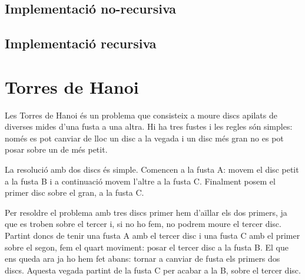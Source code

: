 \subsection{Implementació no-recursiva}


\subsection{Implementació recursiva}


\section{Torres de Hanoi}
Les Torres de Hanoi és un problema que consisteix a moure discs apilats de diverses mides d'una fusta a una altra.
Hi ha tres fustes i les regles són simples: només es pot canviar de lloc un disc a la vegada i un disc més gran no es pot posar sobre un de més petit.

La resolució amb dos discs és simple. Comencen a la fusta A: movem el disc petit a la fusta B i a continuació movem l'altre a la fusta C. Finalment posem el primer disc sobre el gran, a la fusta C.

\noindent
\begin{center}
	\resizebox{0.49\textwidth}{!}{}
	\resizebox{0.49\textwidth}{!}{}
	\resizebox{0.49\textwidth}{!}{}
	\resizebox{0.49\textwidth}{!}{}
\end{center}

Per resoldre el problema amb tres discs primer hem d'aïllar els dos primers, ja que es troben sobre el tercer i, si no ho fem, no podrem moure el tercer disc.
Partint doncs de tenir una fusta A amb el tercer disc i una fusta C amb el primer sobre el segon, fem el quart moviment: posar el tercer disc a la fusta B.
El que ens queda ara ja ho hem fet abans: tornar a canviar de fusta els primers dos discs.
Aquesta vegada partint de la fusta C per acabar a la B, sobre el tercer disc.

\noindent
\begin{center}
	\resizebox{0.32\textwidth}{!}{}
	\resizebox{0.32\textwidth}{!}{}
	\resizebox{0.32\textwidth}{!}{}
	\resizebox{0.32\textwidth}{!}{}
	\resizebox{0.32\textwidth}{!}{}
	\resizebox{0.32\textwidth}{!}{}
	\resizebox{0.32\textwidth}{!}{}
	\resizebox{0.32\textwidth}{!}{}
\end{center}

